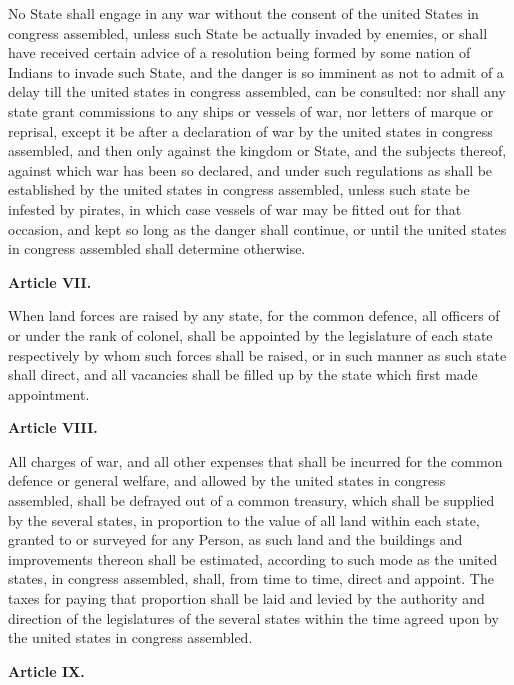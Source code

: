 No State shall engage in any war without the consent of the united States in congress assembled, unless such State be actually invaded by enemies, or shall have received certain advice of a resolution being formed by some nation of Indians to invade such State, and the danger is so imminent as not to admit of a delay till the united states in congress assembled, can be consulted: nor shall any state grant commissions to any ships or vessels of war, nor letters of marque or reprisal, except it be after a declaration of war by the united states in congress assembled, and then only against the kingdom or State, and the subjects thereof, against which war has been so declared, and under such regulations as shall be established by the united states in congress assembled, unless such state be infested by pirates, in which case vessels of war may be fitted out for that occasion, and kept so long as the danger shall continue, or until the united states in congress assembled shall determine otherwise.

\begin{center}
\textbf{Article VII.} 
\end{center}

When land forces are raised by any state, for the common defence, all officers of or under the rank of colonel, shall be appointed by the legislature of each state respectively by whom such forces shall be raised, or in such manner as such state shall direct, and all vacancies shall be filled up by the state which first made appointment.

\begin{center}
\textbf{Article VIII.} 
\end{center}

All charges of war, and all other expenses that shall be incurred for the common defence or general welfare, and allowed by the united states in congress assembled, shall be defrayed out of a common treasury, which shall be supplied by the several states, in proportion to the value of all land within each state, granted to or surveyed for any Person, as such land and the buildings  and improvements thereon shall be estimated, according to such mode as the united states, in congress assembled, shall, from time to time, direct and appoint. The taxes for paying that proportion shall be laid and levied by the authority and direction of the legislatures of the several states within the time agreed upon by the united states in congress assembled.

\begin{center}
\textbf{Article IX.} 
\end{center}

